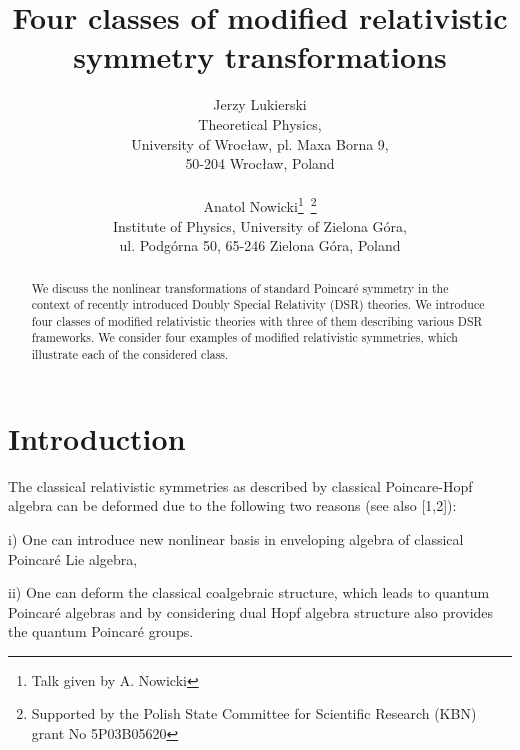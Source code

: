 \documentclass[a4paper,12pt]{article} \usepackage{times}
\begin{document}
 \title{Four classes of modified relativistic 
symmetry
transformations} \author{Jerzy Lukierski \\ %
Theoretical Physics, \\
  University of Wroc{\l}aw, pl. 
Maxa Borna 9, 
 \\
50-204 Wroc{\l}aw, Poland
\\ \\
Anatol Nowicki\thanks{Talk given by A. Nowicki}\ 
\thanks{Supported 
by the Polish State Committee for Scientific Research 
 (KBN) grant No 5P03B05620}
\\ 
Institute of Physics, University of Zielona G\'{o}ra, 
\\ 
 ul. Podg\'{o}rna 50, 65-246 
 Zielona G\'{o}ra, Poland}


\date{}     
\maketitle  



\begin{abstract}
We discuss the nonlinear transformations of standard Poincar\'{e}
symmetry in   the context of recently introduced Doubly Special
Relativity (DSR) theories. We introduce four classes of modified
relativistic theories with three of them describing various DSR
frameworks. We consider four examples of modified relativistic
symmetries, which illustrate each of the considered class.
\end{abstract}





\section{Introduction}


The classical relativistic symmetries as described by classical
Poincare-Hopf algebra can be deformed due to the following two
reasons (see also [1,2]):
\begin{description}
\item{ i)} One can introduce new nonlinear basis in enveloping
algebra of classical Poincar\'{e} Lie algebra,
\item{ii)} One can deform the classical coalgebraic structure,
which leads to quantum Poincar\'{e} algebras and by considering
dual Hopf algebra structure also provides the quantum Poincar\'{e}
groups.
\end{description}
\end{document}
